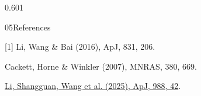 \documentclass[final]{beamer}
\newcommand{\captiontype}{\sffamily\fontsize{20}{26}\selectfont}
\begin{document}
\begin{frame}[t]
\begin{columns}[T,onlytextwidth]
\begin{column}{0.601\paperwidth}
\vspace{0.55cm}
\begin{posterpanel}{05}{References}
{\captiontype\color{muted}\raggedright
\setlength{\parskip}{0pt}
[1] Li, Wang \& Bai (2016), ApJ, 831, 206.\par
[2] Cackett, Horne \& Winkler (2007), MNRAS, 380, 669.\par
[3] \href{https://doi.org/10.3847/1538-4357/addf40}{Li, Shangguan, Wang et al. (2025), ApJ, 988, 42}.\par}
\end{posterpanel}
\end{column}
\end{columns}
\end{frame}
\end{document}

